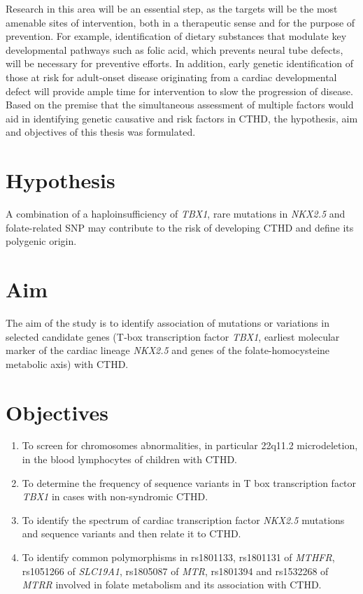 \begin{refsection}
Research in this area will be an essential step, as the targets will be the most amenable sites of intervention, both in a therapeutic sense and for the purpose of prevention. For example, identification of dietary substances that modulate key developmental pathways such as folic acid, which prevents neural tube defects, will be necessary for preventive efforts. In addition, early genetic identification of those at risk for adult-onset disease originating from a cardiac developmental defect will provide ample time for intervention to slow the progression of disease. Based on the premise that the simultaneous assessment of multiple factors would aid in identifying genetic causative and risk factors in CTHD, the hypothesis, aim and objectives of this thesis was formulated.

\section{Hypothesis}

A combination of a haploinsufficiency of \textit{TBX1}, rare mutations in \textit{NKX2.5} and folate-related SNP may contribute to the risk of developing CTHD and define its polygenic origin.

\section{Aim}

The aim of the study is to identify association of mutations or variations in selected candidate genes (T‐box transcription factor \textit{TBX1}, earliest molecular marker of the cardiac lineage \textit{NKX2.5} and genes of the folate-homocysteine metabolic axis) with CTHD. 

\section{Objectives}

\begin{sloppypar}
\begin{enumerate}
\item To screen for chromosomes abnormalities, in particular 22q11.2 microdeletion, in the blood lymphocytes of children with CTHD.
\item To determine the frequency of sequence variants in T box transcription factor \textit{TBX1} in cases with non-syndromic CTHD. 
\item To identify the spectrum of cardiac transcription factor \textit{NKX2.5} mutations and sequence variants and then relate it to CTHD.
\item To identify common polymorphisms in rs1801133, rs1801131 of \textit{MTHFR}, rs1051266 of \textit{SLC19A1}, rs1805087 of \textit{MTR}, rs1801394 and rs1532268 of \textit{MTRR} involved in folate metabolism and its association with CTHD.
\end{enumerate}
\end{sloppypar}

\clearpage
\printbibliography[heading=subbibintoc]
\end{refsection}

